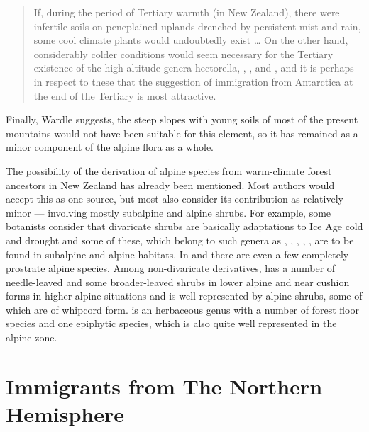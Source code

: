 \begin{quote}
	If, during the period of Tertiary warmth (in New Zealand), there were infertile soils on peneplained uplands drenched by persistent mist and rain, some cool climate plants would undoubtedly exist … On the other hand, considerably colder conditions would seem necessary for the Tertiary existence of the high altitude genera hectorella, , ,  and , and it is perhaps in respect to these that the suggestion of immigration from Antarctica at the end of the Tertiary is most attractive.
\end{quote}

Finally, Wardle suggests, the steep slopes with young soils of most of the present mountains would not have been suitable for this element, so it has remained as a minor component of the alpine flora as a whole.

The possibility of the derivation of alpine species from warm-climate forest ancestors in New Zealand has already been mentioned.
Most authors would accept this as one source, but most also consider its contribution as relatively minor --- involving mostly subalpine and alpine shrubs.
For example, some botanists consider that divaricate shrubs are basically adaptations to Ice Age cold and drought and some of these, which belong to such genera as , , , , , are to be found in subalpine and alpine habitats.
In  and  there are even a few completely prostrate alpine species.
Among non-divaricate derivatives,  has a number of needle-leaved and some broader-leaved shrubs in lower alpine and near cushion forms in higher alpine situations and  is well represented by alpine shrubs, some of which are of whipcord form.  is an herbaceous genus with a number of forest floor species and one epiphytic species, which is also quite well represented in the alpine zone.

\section{Immigrants from The Northern Hemisphere}

